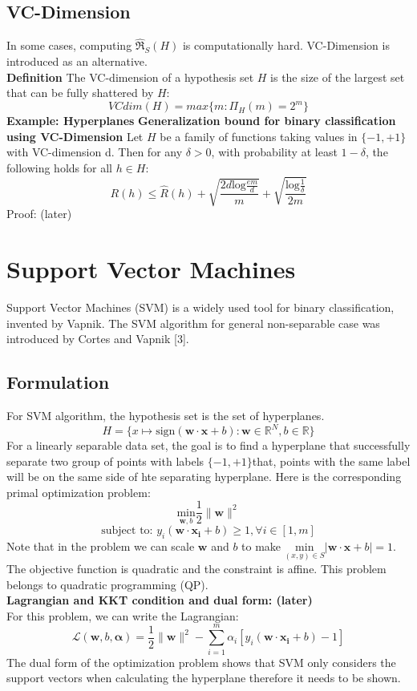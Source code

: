 \documentclass[12pt]{article}
\theoremstyle{definition}
\theoremstyle{remark}
\numberwithin{equation}{section}
\begin{document}
\subsection{VC-Dimension}
In some cases, computing $\mathfrak{\widehat{R}}_S(H)$ is computationally hard. VC-Dimension is introduced as an alternative. \\[0.2cm]
\textbf{Definition}
The VC-dimension of a hypothesis set $H$ is the size of the largest set that can be fully shattered by $H$:
\[VCdim(H) = max\{m:\Pi_H(m) = 2^m\}\]
\textbf{Example: Hyperplanes}
\textbf{Generalization bound for binary classification using VC-Dimension}
Let $H$ be a family of functions taking values in $\{-1,+1\}$ with VC-dimension d. Then for any $\delta > 0$, with probability at least $1-\delta$, the following holds for all $h \in H$:
\[R(h) \leq \widehat{R}(h) + \sqrt{\frac{2d\mathrm{log}\frac{em}{d}}{m}} + \sqrt{\frac{\mathrm{log}\frac{1}{\delta}}{2m}}\]
Proof: (later)
\section{Support Vector Machines}
Support Vector Machines (SVM) is a widely used tool for binary classification, invented by Vapnik. The SVM algorithm for general non-separable case was introduced by Cortes and Vapnik [3].
\subsection{Formulation}
For SVM algorithm, the hypothesis set is the set of hyperplanes.
\[H = \{x\mapsto \mathrm{sign}(\mathbf{w\cdot x}+b): \mathbf{w} \in \mathbb{R}^N, b \in \mathbb{R} \}\]
For a linearly separable data set, the goal is to find a hyperplane that successfully separate two group of points with labels $\{-1,+1\}$that, points with the same label will be on the same side of hte separating hyperplane. Here is the corresponding primal optimization problem:
\[\underset{\mathbf{w}, b}{\mathrm{min}} \frac{1}{2}\|\mathbf{w}\|^2\]
\[\text{subject to: } y_i(\mathbf{w\cdot x_i}+b) \geq 1, \forall i \in [1,m]\]
Note that in the problem we can scale $\mathbf{w}$ and $b$ to make $\underset{(x,y)\in S}{\mathrm{min}}|\mathbf{w\cdot x}+b| =1 $.
The objective function is quadratic and the constraint is affine. This problem belongs to quadratic programming (QP). \\[0.2cm]
\textbf{Lagrangian and KKT condition and dual form: (later)} \\[0.2cm]
For this problem, we can write the Lagrangian:
\[\mathcal{L}(\mathbf{w},b,\mathbf{\alpha})=\frac{1}{2}\|\mathbf{w}\|^2-\sum_{i=1}^{m}\alpha_i [y_i(\mathbf{w\cdot x_i}+b)-1]\]
The dual form of the optimization problem shows that SVM only considers the support vectors when calculating the hyperplane therefore it needs to be shown. 
\end{document}
